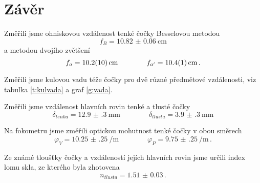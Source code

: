\section*{Závěr}
Změřili jsme ohniskovou vzdálenost tenké čočky Besselovou metodou
\begin{equation*}
f_B=\SI{10.82(6)}{\cm}
\end{equation*}
a metodou dvojího zvětšení
\begin{equation*}
f_{a} = \SI{10.2(10)}{\cm} \qquad \qquad f_{\apr}=\SI{10.4(1)}{\cm} \,.
\end{equation*}

Změřili jsme kulovou vadu téže čočky pro dvě různé předmětové vzdálenosti, viz tabulka \ref{t:kulvada} a graf \ref{g:vada}.

Změřili jsme vzdálenost hlavních rovin tenké a tlusté čočky
\begin{equation*}
\delta_{tenka} = \SI{12.9(3)}{\mm} \qquad \qquad \delta_{tlusta} = \SI{3.9(3)}{\mm}
\end{equation*}

Na fokometru jsme změřili optickou mohutnost tenké čočky v obou směrech
\begin{equation*}
\varphi_V=\SI{10.25(25)}{\per\metre} \qquad \qquad \varphi_P=\SI{9.75(25)}{\per\metre} \,.
\end{equation*}

Ze známé tloušťky čočky a vzdáleností jejích hlavních rovin jsme určili index lomu skla, ze kterého byla zhotovena
\begin{equation*}
n_{tlusta}=\num{1.51(3)} \,.
\end{equation*}